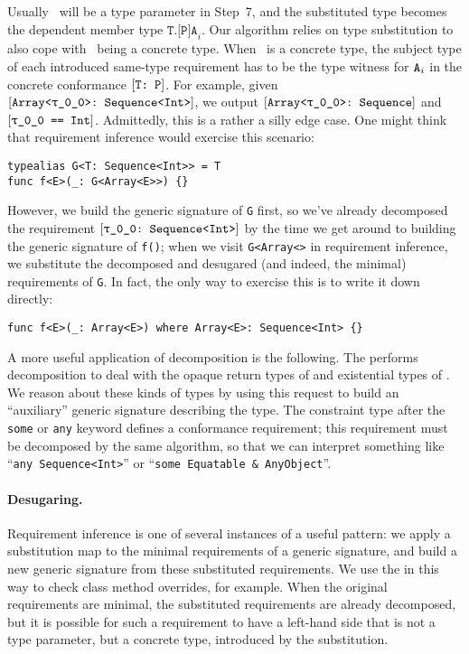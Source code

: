 \documentclass[../generics]{subfiles}
\begin{document}
Usually \tT\ will be a type parameter in Step~7, and the substituted type becomes the dependent member type $\texttt{T.[P]A}_i$. Our algorithm relies on type substitution to also cope with \tT\ being a concrete type. When \tT\ is a concrete type, the subject type of each introduced same-type requirement has to be the type witness for $\texttt{A}_i$ in the concrete conformance $[\texttt{T:~P}]$. For example, given $\ConfReq{Array<\rT>}{Sequence<Int>}$, we output $\ConfReq{Array<\rT>}{Sequence}$ and $\SameReq{\rT}{Int}$. Admittedly, this is a rather a silly edge case. One might think that requirement inference would exercise this scenario:
\begin{Verbatim}
typealias G<T: Sequence<Int>> = T
func f<E>(_: G<Array<E>>) {}
\end{Verbatim}
However, we build the generic signature of \texttt{G} first, so we've already decomposed the requirement $\ConfReq{\rT}{Sequence<Int>}$ by the time we get around to building the generic signature of \texttt{f()}; when we visit \texttt{G<Array<\rT>} in requirement inference, we substitute the decomposed and desugared (and indeed, the minimal) requirements of \texttt{G}. In fact, the only way to exercise this is to write it down directly:
\begin{Verbatim}
func f<E>(_: Array<E>) where Array<E>: Sequence<Int> {}
\end{Verbatim}

A more useful application of decomposition is the following. The  performs decomposition to deal with the opaque return types of  and existential types of . We reason about these kinds of types by using this request to build an ``auxiliary'' generic signature describing the type. The constraint type after the \texttt{some} or \texttt{any} keyword defines a conformance requirement; this requirement must be decomposed by the same algorithm, so that we can interpret something like ``\texttt{any Sequence<Int>}'' or ``\verb|some Equatable & AnyObject|''.

\paragraph{Desugaring.}
Requirement inference is one of several instances of a useful pattern: we apply a substitution map to the minimal requirements of a generic signature, and build a new generic signature from these substituted requirements. We use the  in this way to check class method overrides, for example. When the original requirements are minimal, the substituted requirements are already decomposed, but it is possible for such a requirement to have a left-hand side that is not a type parameter, but a concrete type, introduced by the substitution.
\end{document}
